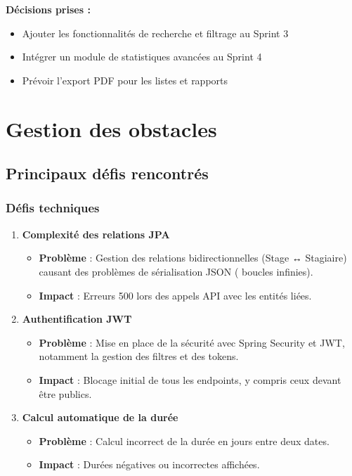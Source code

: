 \documentclass[12pt,a4paper]{report}
\begin{document}
\textbf{Décisions prises :}
\begin{itemize}[leftmargin=1cm]
    \item Ajouter les fonctionnalités de recherche et filtrage au Sprint 3
    \item Intégrer un module de statistiques avancées au Sprint 4
    \item Prévoir l'export PDF pour les listes et rapports
\end{itemize}

\section{Gestion des obstacles}

\subsection{Principaux défis rencontrés}

\subsubsection{Défis techniques}

\begin{enumerate}[leftmargin=1cm]
    \item \textbf{Complexité des relations JPA}
    \begin{itemize}
        \item \textbf{Problème} : Gestion des relations bidirectionnelles (Stage ↔ Stagiaire) causant des problèmes de sérialisation JSON ( boucles infinies).
        \item \textbf{Impact} : Erreurs 500 lors des appels API avec les entités liées.
    \end{itemize}
    
    \item \textbf{Authentification JWT}
    \begin{itemize}
        \item \textbf{Problème} : Mise en place de la sécurité avec Spring Security et JWT, notamment la gestion des filtres et des tokens.
        \item \textbf{Impact} : Blocage initial de tous les endpoints, y compris ceux devant être publics.
    \end{itemize}
    
    \item \textbf{Calcul automatique de la durée}
    \begin{itemize}
        \item \textbf{Problème} : Calcul incorrect de la durée en jours entre deux dates.
        \item \textbf{Impact} : Durées négatives ou incorrectes affichées.
    \end{itemize}
\end{enumerate}
\end{document}
